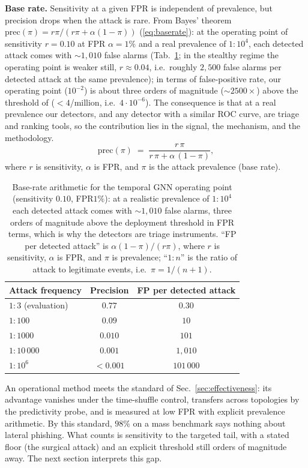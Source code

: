 \smallskip\noindent\textbf{Base rate.} Sensitivity at a given FPR is independent of prevalence, but
precision drops when the attack is rare. From Bayes' theorem
$\mathrm{prec}(\pi)=r\pi/(r\pi+\alpha(1-\pi))$
(\ref{eq:baserate}): at the operating point of sensitivity $r{=}0.10$ at FPR $\alpha{=}1\%$ and a real prevalence of
$1{:}10^4$, each detected attack comes with $\sim\!1{,}010$ false alarms (Tab.~\ref{tab:baserate}; in the
stealthy regime the operating point is weaker still, $r\!\approx\!0.04$, i.e.\ roughly $2{,}500$ false
alarms per detected attack at the same prevalence); in terms of
false-positive rate, our operating point ($10^{-2}$) is about three orders of magnitude ($\sim\!2500\times$)
above the threshold of \citet{ho2019detecting} ($<\!4$/million, i.e.\ $4\cdot10^{-6}$). The consequence is that at a real
prevalence our detectors, and any detector with a similar ROC curve, are triage and ranking tools, so the contribution lies in the signal, the mechanism, and the methodology.
\begin{equation}
\mathrm{prec}(\pi) \;=\; \frac{r\,\pi}{r\,\pi + \alpha\,(1-\pi)},
\label{eq:baserate}
\end{equation}
where $r$ is sensitivity, $\alpha$ is FPR, and $\pi$ is the attack prevalence (base rate).

\begin{table}[pos=tbp]\centering
\begin{tabular}{lcc}
\toprule
Attack frequency & Precision & FP per detected attack \\
\midrule
$1{:}3$ (evaluation) & $0.77$ & $0.30$ \\
$1{:}100$           & $0.09$ & $10$        \\
$1{:}1000$          & $0.010$ & $101$      \\
$1{:}10\,000$       & $0.001$ & $1{,}010$     \\
$1{:}10^6$          & $<\!0.001$ & $101\,000$ \\
\bottomrule
\end{tabular}
\caption{Base-rate arithmetic for the temporal GNN operating point (sensitivity $0.10$, FPR$1\%$): at a
realistic prevalence of $1{:}10^4$ each detected attack comes with $\sim\!1{,}010$ false alarms, three orders of
magnitude above the deployment threshold in FPR terms, which is why the detectors are triage instruments. ``FP per
detected attack'' is $\alpha(1-\pi)/(r\pi)$, where $r$ is sensitivity, $\alpha$ is FPR, and $\pi$ is
prevalence; ``$1{:}n$'' is the ratio of attack to legitimate events, i.e.\ $\pi=1/(n{+}1)$.}
\label{tab:baserate}
\end{table}

\noindent An operational method meets the standard of Sec.~\ref{sec:effectiveness}: its advantage vanishes
under the time-shuffle control, transfers across topologies by the predictivity probe, and is measured at low
FPR with explicit prevalence arithmetic. By this standard, $98\%$ on a mass benchmark says nothing about lateral
phishing. What counts is sensitivity to the targeted tail, with a stated floor (the surgical attack) and an
explicit threshold still orders of magnitude away. The next section interprets this gap.
